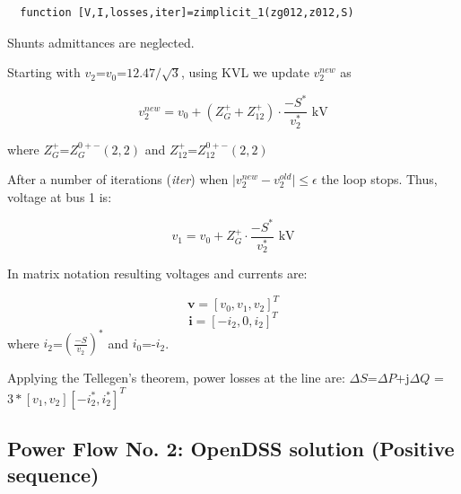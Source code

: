 \documentclass[12pt]{article}
\begin{document}
\begin{verbatim}
  function [V,I,losses,iter]=zimplicit_1(zg012,z012,S)
\end{verbatim}

Shunts admittances are neglected.

\begin{figure}[hbt]
\end{figure}
\newpage

Starting with ${v}_2$=$v_0$=$12.47/\sqrt{3}$, using KVL we update ${v}^{new}_2$ as

\begin{equation}
  {v}^{new}_2=v_0+({Z}^{+}_{G}+{Z}^{+}_{12})\cdot \frac{-{S}^*}{{v}^*_2}\mbox{ kV}
\end{equation}

where ${Z}^{+}_{G}$=${Z}^{0+-}_{G}(2,2)$ and ${Z}^{+}_{12}$=${Z}^{0+-}_{12}(2,2)$

After a number of iterations (\textit{iter}) when $\mid{v}^{new}_2-{v}^{old}_2\mid\leq \epsilon$ the loop stops. Thus, voltage at bus 1 is:

\begin{equation}
  {v}_1=v_0+{Z}^{+}_{G}\cdot \frac{-{S}^*}{{v}^*_2}\mbox{ kV}
\end{equation}

In matrix notation resulting voltages and currents are:

\begin{equation}
  \bm{v}=[{v}_0, {v}_1,{v}_2]^T
\end{equation}
\begin{equation}
  \bm{i}=[-{i}_2,0,{i}_2]^T
\end{equation}
where ${i}_2$=$(\frac{-{S}}{{v}_2})^*$ and  ${i}_0$=-${i}_2$.

Applying the Tellegen's theorem, power losses at the line are: $\Delta {S}$=$\Delta P$+j$\Delta Q$ 
=$3*[{v}_1,{v}_2][-{i}^*_2,{i}^*_2]^T$

\subsection{Power Flow No. 2: OpenDSS solution (Positive sequence)}
\end{document}
